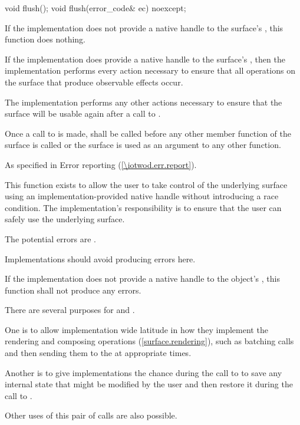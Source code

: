 \begin{itemdecl}
void flush();
void flush(error_code& ec) noexcept;
\end{itemdecl}
\begin{itemdescr}
\pnum
\effects
If the implementation does not provide a native handle to the surface's \underlyingsurface, this function does nothing.

\pnum
If the implementation does provide a native handle to the surface's \underlyingsurface, then the implementation performs every action necessary to ensure that all operations on the surface that produce observable effects occur.

\pnum
The implementation performs any other actions necessary to ensure that the surface will be usable again after a call to .

\pnum
Once a call to  is made,  shall be called before any other member function of the surface is called or the surface is used as an argument to any other function.

\pnum
\throws
As specified in Error reporting (\ref{\iotwod.err.report}).

\pnum
\remarks
This function exists to allow the user to take control of the underlying surface using an implementation-provided native handle without introducing a race condition. The implementation's responsibility is to ensure that the user can safely use the underlying surface.

\pnum
\errors
The potential errors are .

\pnum
Implementations should avoid producing errors here.

\pnum
If the implementation does not provide a native handle to the  object's \underlyingsurface, this function shall not produce any errors.

\pnum
\realnotes
There are several purposes for  and .

\pnum
One is to allow implementation wide latitude in how they implement the rendering and composing operations (\ref{surface.rendering}), such as batching calls and then sending them to the \underlyingrendandpresenttechs at appropriate times.

\pnum
Another is to give implementations the chance during the call to  to save any internal state that might be modified by the user and then restore it during the call to .

\pnum
Other uses of this pair of calls are also possible.
\end{itemdescr}

